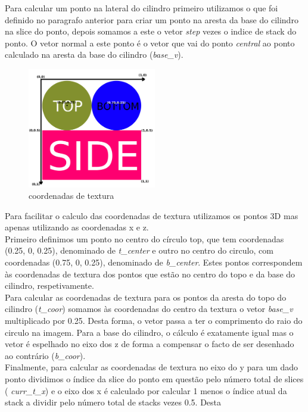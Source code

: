 \documentclass[a4paper]{report}
\begin{document}
Para calcular um ponto na lateral do cilindro primeiro utilizamos o que foi
definido no paragrafo anterior para criar um ponto na aresta da base do cilindro
na slice do ponto, depois somamos a este o vetor \textit{step} vezes o indice de
stack do ponto. O vetor normal a este ponto é o vetor que vai do ponto
\textit{central} ao ponto calculado na aresta da base do cilindro
(\textit{base\_v}).\\
\begin{figure}[H]
    \centering 
    \includegraphics[width=0.5\textwidth]{images/cylinder_texture_scheme.png}  
    \caption{coordenadas de textura}
\end{figure}
Para facilitar o calculo das coordenadas de textura utilizamos os pontos 3D mas
apenas utilizando as coordenadas x e z.\\
Primeiro definimos um ponto no centro do círculo top, que tem coordenadas (0.25,
0, 0.25), denominado de \textit{t\_center} e outro no centro do circulo, com
coordenadas (0.75, 0, 0.25), denominado de \textit{b\_center}. Estes pontos
correspondem às coordenadas de textura dos pontos que estão no centro do topo e
da base do cilindro, respetivamente.\\
Para calcular as coordenadas de textura para os pontos da aresta do topo do
cilindro (\textit{t\_coor}) somamos às coordenadas do centro da textura o vetor
\textit{base\_v} multiplicado por 0.25. Desta forma, o vetor passa a ter o
comprimento do raio do circulo na imagem. Para a base do cilindro, o cálculo é
exatamente igual mas o vetor é espelhado no eixo dos z de forma a compensar o
facto de ser desenhado ao contrário (\textit{b\_coor}).\\
Finalmente, para calcular as coordenadas de textura no eixo do y para um dado
ponto dividimos o índice da slice do ponto em questão pelo número total de
slices ( \textit{curr\_t\_x}) e o eixo dos x é calculado por calcular 1 menos o
índice atual da stack a dividir pelo número total de stacks vezes 0.5. Desta
\end{document}
